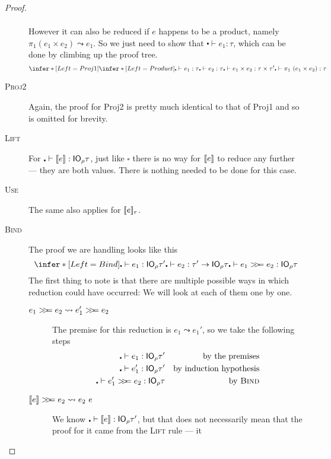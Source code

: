 \begin{proof}
\begin{description}
\begin{align*}
    \end{align*}
    However it can also be reduced if $e$ happens to be a product,
    namely $\pi_1 (e_1 \times e_2) \leadsto e_1$. So we just need to show that
    ${\centerdot \vdash e_1 : \tau}$, which can be done by climbing up the proof tree.
    \[
      \infer*[Left=Proj1]{ \infer*[Left=Product]{\centerdot \vdash e_1 : \tau  \\ \centerdot \vdash
          e_2 : \tau}{\centerdot \vdash e_1
          \times e_2 : \tau \times \tau'} }
      {\centerdot \vdash \pi_1 \ (e_1 \times e_2) : \tau}
    \]
  \item[\rm\textsc{Proj2}] Again, the proof for \textsf{Proj2} is
    pretty much identical to that of \textsf{Proj1} and so is omitted
    for brevity.
  \item[\rm\textsc{Lift}] For
    $\centerdot \vdash \lift{e} : \IO_\rho \tau$, just like $\square$ there is no way
    for $\lift{e}$ to reduce any further --- they are both
    values. There is nothing needed to be done for this case.
  \item[\rm\textsc{Use}] The same also applies for $\use{r}{e}$.
  \item[\rm\textsc{Bind}] The proof we are handling looks like this
    \[ \infer*[Left=Bind]{\centerdot \vdash e_1 : \IO_\rho \tau' \\ \centerdot \vdash e_2 : \tau' \rightarrow \IO_\rho \tau}{\centerdot \vdash e_1 \bind
        e_2 : \IO_\rho \tau} \]
    The first thing to note is that there are
    multiple possible ways in which reduction could have occurred: We
    will look at each of them one by one.
    \begin{description}
    \item[$e_1 \bind e_2 \leadsto e_1' \bind e_2$] The premise for this
      reduction is $e_1 \leadsto e_1'$, so we take the following steps
      \begin{align*}
        \centerdot \vdash e_1 : \IO_\rho \tau' && \text{by the premises} \\
        \centerdot \vdash e_1' : \IO_\rho \tau' && \text{by induction hypothesis} \\
        \centerdot \vdash e_1' \bind e_2 : \IO_\rho \tau && \text{by \textsc{Bind}}
      \end{align*}
    \item[$\lift{e} \bind e_2 \leadsto e_2 \ e$] We know
      $\centerdot \vdash \lift{e} : \IO_\rho \tau'$, but that does not necessarily mean
      that the proof for it came from the \textsc{Lift} rule --- it

\end{description}
\end{description}
\end{proof}
